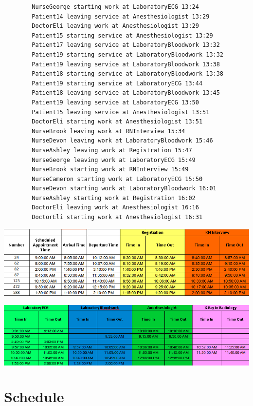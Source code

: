 \documentclass[12pt]{article}
\begin{document}
\begin{verbatim}
		NurseGeorge starting work at LaboratoryECG 13:24
		Patient14 leaving service at Anesthesiologist 13:29
		DoctorEli leaving work at Anesthesiologist 13:29
		Patient15 starting service at Anesthesiologist 13:29
		Patient17 leaving service at LaboratoryBloodwork 13:32
		Patient19 starting service at LaboratoryBloodwork 13:32
		Patient19 leaving service at LaboratoryBloodwork 13:38
		Patient18 starting service at LaboratoryBloodwork 13:38
		Patient19 starting service at LaboratoryECG 13:44
		Patient18 leaving service at LaboratoryBloodwork 13:45
		Patient19 leaving service at LaboratoryECG 13:50
		Patient15 leaving service at Anesthesiologist 13:51
		DoctorEli starting work at Anesthesiologist 13:51
		NurseBrook leaving work at RNInterview 15:34
		NurseDevon leaving work at LaboratoryBloodwork 15:46
		NurseAshley leaving work at Registration 15:47
		NurseGeorge leaving work at LaboratoryECG 15:49
		NurseBrook starting work at RNInterview 15:49
		NurseCameron starting work at LaboratoryECG 15:50
		NurseDevon starting work at LaboratoryBloodwork 16:01
		NurseAshley starting work at Registration 16:02
		DoctorEli leaving work at Anesthesiologist 16:16
		DoctorEli starting work at Anesthesiologist 16:31
		\end{verbatim}
		
\includegraphics[scale=0.5]{sample1.png}

\quad

\includegraphics[scale=0.5]{sample2.png}

\newpage
\section{Schedule}
\end{document}
